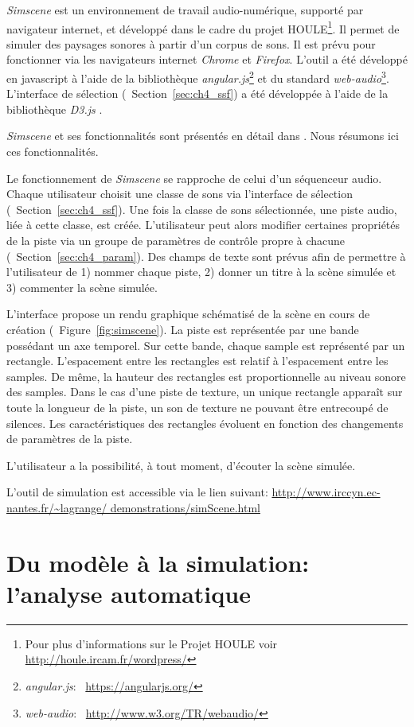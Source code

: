 \emph{Simscene} est un environnement de travail audio-numérique, supporté par navigateur internet, et développé dans le cadre du projet HOULE\footnote{Pour plus d’informations sur le Projet HOULE voir \url{http://houle.ircam.fr/wordpress/}}. Il permet de simuler des paysages sonores à partir d'un corpus de sons. Il est prévu pour fonctionner via les navigateurs internet \emph{Chrome} et \emph{Firefox}. L'outil a été développé en javascript à l'aide de la bibliothèque \emph{angular.js}\footnote{\emph{angular.js}: \cf~\url{https://angularjs.org/}} et du standard \emph{web-audio}\footnote{\emph{web-audio}: \cf~\url{http://www.w3.org/TR/webaudio/}}. L'interface de sélection (\cf~Section~\ref{sec:ch4_ssf}) a été développée à l'aide de la bibliothèque \emph{D3.js} \citep{d32011}.

\emph{Simscene} et ses fonctionnalités sont présentés en détail dans \citep{rossignol2015simscene}. Nous résumons ici ces fonctionnalités. 

Le fonctionnement de \emph{Simscene} se rapproche de celui d'un séquenceur audio. Chaque utilisateur choisit une classe de sons via l'interface de sélection (\cf~Section~\ref{sec:ch4_ssf}). Une fois la classe de sons sélectionnée, une piste audio, liée à cette classe, est créée. L'utilisateur peut alors modifier certaines propriétés de la piste via un groupe de paramètres de contrôle propre à chacune (\cf~Section~\ref{sec:ch4_param}). Des champs de texte sont prévus afin de permettre à l'utilisateur de 1) nommer chaque piste, 2) donner un titre à la scène simulée et 3) commenter la scène simulée.

L'interface propose un rendu graphique schématisé de la scène en cours de création (\cf~Figure~\ref{fig:simscene}). La piste est représentée par une bande possédant un axe temporel. Sur cette bande, chaque sample est représenté par un rectangle. L'espacement entre les rectangles est relatif à l'espacement entre les samples. De même, la hauteur des rectangles est proportionnelle au niveau sonore des samples. Dans le cas d'une piste de texture, un unique rectangle apparaît sur toute la longueur de la piste, un son de texture ne pouvant être entrecoupé de silences. Les caractéristiques des rectangles évoluent en fonction des changements de paramètres de la piste.

L'utilisateur a la possibilité, à tout moment, d'écouter la scène simulée.

L'outil de simulation est accessible via le lien suivant: \url{http://www.irccyn.ec-nantes.fr/~lagrange/
demonstrations/simScene.html}

\section{Du modèle à la simulation: l'analyse automatique}
\label{sec:ch4_modAnaAuto}

